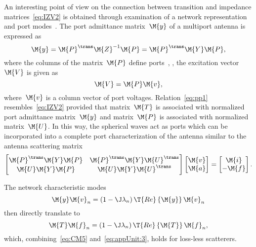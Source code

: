 \documentclass[journal]{IEEEtran}
\begin{document}
An interesting point of view on the connection between transition and impedance matrices~\eqref{eq:IZV2} is obtained through examination of a network representation~\cite{Capeketal_OptimalityOfTARCAndRealizedGainForMultiPortAntennas} and port modes~\cite{HarringtonMautz_ControlOfRadarScatteringByReactiveLoading}. The port admittance matrix~$\M{y}$ of a multiport antenna is expressed as
\begin{equation}
\M{y} = \M{P}^\trans \M{Z}^{-1} \M{P} = \M{P}^\trans \M{Y} \M{P},
\label{eq:pp1}
\end{equation}
where the columns of the matrix~$\M{P}$ define ports~\cite{Capeketal_OptimalityOfTARCAndRealizedGainForMultiPortAntennas}, \ie{}, the excitation vector~$\M{V}$ is given as
\begin{equation}
\M{V} = \M{P} \M{v},
\label{eq:pp3}
\end{equation}
where~$\M{v}$ is a column vector of port voltages. Relation~\eqref{eq:pp1} resembles~\eqref{eq:IZV2} provided that matrix~$\M{T}$ is associated with normalized port admittance matrix~$\M{y}$ and matrix~$\M{P}$ is associated with normalized matrix~$\M{U}$. In this way, the spherical waves act as ports which can be incorporated into a complete port characterization of the antenna similar to the antenna scattering matrix~\cite{1948_Montgomery_Principles_of_Microwave_Circuits,Hansen_SphericalNearFieldAntennaMeasurements} 
\begin{equation}
	\begin{bmatrix}
		\M{P}^{\trans}\M{Y}\M{P} & \M{P}^{\trans}\M{Y}\M{U}^{\trans}\\
		\M{U}\M{Y}\M{P} & \M{U}\M{Y}\M{U}^{\trans}\\
	\end{bmatrix}
	\begin{bmatrix}
		\M{v} \\
		\M{a} 		
	\end{bmatrix}
	=\begin{bmatrix}
		\M{i} \\
		-\M{f} 		
	\end{bmatrix}.
\label{eq:}
\end{equation}

The network characteristic modes~\cite{Mautz1973}
\begin{equation}
\M{y} \M{v}_n = \left( 1 -\J \lambda_n \right) \T{Re} \left\{\M{y} \right\}\M{v}_n
\label{eq:pp2}
\end{equation}
then directly translate to
\begin{equation}
\M{T} \M{f}_n = \left(1 - \J \lambda_n \right) \T{Re} \left\{\M{T} \right\}\M{f}_n,
\label{eq:ppx}
\end{equation}
which, combining~\eqref{eq:CM5} and~\eqref{eq:appUnit:3}, holds for loss-less scatterers.
\end{document}
